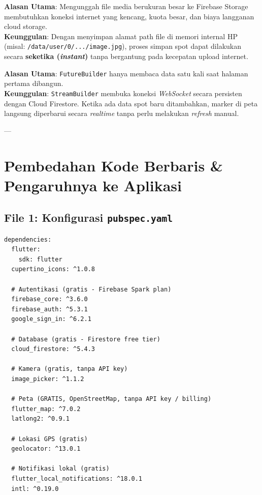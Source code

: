 \documentclass[12pt,a4paper]{article}
\begin{document}
\begin{highlightbox}
\textbf{Alasan Utama}: Mengunggah file media berukuran besar ke Firebase Storage membutuhkan koneksi internet yang kencang, kuota besar, dan biaya langganan cloud storage.\\
\textbf{Keunggulan}: Dengan menyimpan alamat path file di memori internal HP (misal: \texttt{/data/user/0/.../image.jpg}), proses simpan spot dapat dilakukan secara \textbf{seketika (\textit{instant})} tanpa bergantung pada kecepatan upload internet.
\end{highlightbox}

\begin{highlightbox}
\textbf{Alasan Utama}: \texttt{FutureBuilder} hanya membaca data satu kali saat halaman pertama dibangun.\\
\textbf{Keunggulan}: \texttt{StreamBuilder} membuka koneksi \textit{WebSocket} secara persisten dengan Cloud Firestore. Ketika ada data spot baru ditambahkan, marker di peta langsung diperbarui secara \textit{realtime} tanpa perlu melakukan \textit{refresh} manual.
\end{highlightbox}

---

\section{Pembedahan Kode Berbaris \& Pengaruhnya ke Aplikasi}

\subsection{File 1: Konfigurasi \texttt{pubspec.yaml}}

\begin{lstlisting}[language=XML, firstnumber=9, caption=pubspec.yaml]
dependencies:
  flutter:
    sdk: flutter
  cupertino_icons: ^1.0.8

  # Autentikasi (gratis - Firebase Spark plan)
  firebase_core: ^3.6.0
  firebase_auth: ^5.3.1
  google_sign_in: ^6.2.1

  # Database (gratis - Firestore free tier)
  cloud_firestore: ^5.4.3

  # Kamera (gratis, tanpa API key)
  image_picker: ^1.1.2

  # Peta (GRATIS, OpenStreetMap, tanpa API key / billing)
  flutter_map: ^7.0.2
  latlong2: ^0.9.1

  # Lokasi GPS (gratis)
  geolocator: ^13.0.1

  # Notifikasi lokal (gratis)
  flutter_local_notifications: ^18.0.1
  intl: ^0.19.0
\end{lstlisting}
\end{document}
